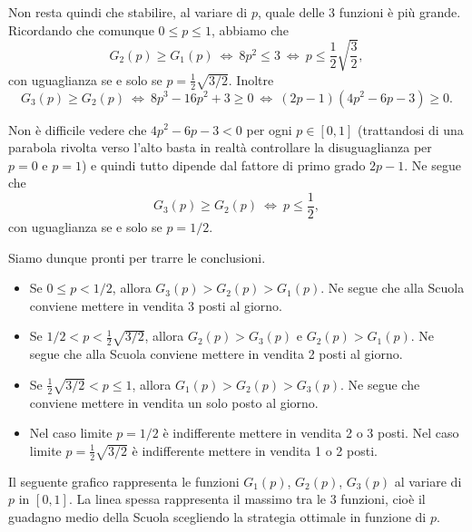 {Non resta quindi che stabilire, al variare di $p$, quale delle 3
funzioni è più grande. Ricordando che comunque $0\leq p\leq
1$, abbiamo che
$$G_{2}(p)\geq G_{1}(p)\ \Longleftrightarrow\ 8p^{2}\leq 3\ \Longleftrightarrow\ 
p\leq \frac{1}{2}\sqrt{\frac{3}{2}},$$
con uguaglianza se e solo se $p=\frac{1}{2}\sqrt{3/2}$. Inoltre
$$G_{3}(p)\geq G_{2}(p)\ \Longleftrightarrow\ 8p^{3}-16p^{2}+3\geq 0
\ \Longleftrightarrow\ (2p-1)(4p^{2}-6p-3)\geq 0.$$

Non è difficile vedere che $4p^{2}-6p-3<0$ per ogni $p\in[0,1]$ (trattandosi di una parabola rivolta verso l'alto basta in realtà controllare la disuguaglianza per $p=0$ e $p=1$) e quindi tutto dipende dal fattore di primo grado $2p-1$.  Ne segue che
$$G_{3}(p)\geq G_{2}(p)\ \Longleftrightarrow\ p\leq\frac{1}{2},$$
con uguaglianza se e solo se $p=1/2$.

Siamo dunque pronti per trarre le conclusioni.
\begin{itemize}
	\item  Se $0\leq p<1/2$, allora $G_{3}(p)>G_{2}(p)>G_{1}(p)$. Ne segue che alla Scuola conviene mettere in vendita 3 posti al giorno.

	\item  Se $1/2<p<\frac{1}{2}\sqrt{3/2}$, allora $G_{2}(p)>G_{3}(p)$ e $G_{2}(p)>G_{1}(p)$. Ne segue che alla Scuola conviene mettere in vendita 2 posti al giorno.

	\item Se $\frac{1}{2}\sqrt{3/2}<p\leq 1$, allora $G_{1}(p)>G_{2}(p)>G_{3}(p)$.  Ne segue che conviene mettere in vendita un solo posto al giorno.
	
	\item Nel caso limite $p=1/2$ è indifferente mettere in vendita 2 o 3 posti. Nel caso limite $p=\frac{1}{2}\sqrt{3/2}$ è indifferente mettere in vendita 1 o 2 posti.
\end{itemize}

Il seguente grafico rappresenta le funzioni $G_{1}(p)$, $G_{2}(p)$, $G_{3}(p)$ al variare di $p$ in $[0,1]$.  La linea spessa rappresenta il massimo tra le 3 funzioni, cioè il guadagno medio della Scuola scegliendo la strategia ottimale in funzione di $p$.

}

